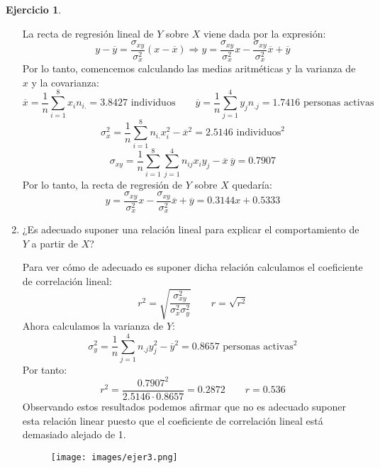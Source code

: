 \documentclass[a4paper, 12pt]{article}
\theoremstyle{definition}
\newtheorem{ej}{Ejercicio}
\begin{document}
\begin{ej}
\begin{enumerate}[label=\alph*)]
La recta de regresión lineal de \(Y\) sobre \(X\) viene dada por la expresión:
\[
	y - \overline{y}  =\frac{\sigma_{xy}}{\sigma_x^2} (x - \overline{x}) \Rightarrow y = \frac{\sigma_{xy}}{\sigma_x^2}x - \frac{\sigma_{xy}}{\sigma_x^2} \overline{x} + \overline{y}
\]
Por lo tanto, comencemos calculando las medias aritméticas y la varianza de \(x\) y la covarianza:
\[
	\overline{x} = \frac{1}{n} \sum_{i=1}^{8} x_i n_{i.} = 3.8427 \text{ individuos} \qquad \overline{y} = \frac{1}{n} \sum_{j=1}^{4} y_j n_{.j} = 1.7416 \text{ personas activas}
\]
\[
	\sigma_x^2 = \frac{1}{n} \sum_{i=1}^{8} n_{i.} x_i^2 - \overline{x}^2 = 2.5146 \text{ individuos}^2
\]
\[
	\sigma_{xy} = \frac{1}{n} \sum_{i=1}^{8} \sum_{j=1}^{4} n_{ij} x_i y_j - \overline{x}\ \overline{y} = 0.7907
\]
Por lo tanto, la recta de regresión de \(Y\) sobre \(X\) quedaría:
\[
	y = \frac{\sigma_{xy}}{\sigma_x^2}x - \frac{\sigma_{xy}}{\sigma_x^2} \overline{x} + \overline{y} = 0.3144x + 0.5333
\]

	\item ¿Es adecuado suponer una relación lineal para explicar el comportamiento de \(Y\) a partir de \(X\)?
	
Para ver cómo de adecuado es suponer dicha relación calculamos el coeficiente de correlación lineal:
\[
	r^2 = \sqrt{\frac{\sigma_{xy}^2}{\sigma_x^2 \sigma_y^2}} \qquad r = \sqrt{r^2}
\]
Ahora calculamos la varianza de \(Y\):
\[
	\sigma_y^2 = \frac{1}{n} \sum_{j=1}^{4} n_{.j} y_j^2 - \overline{y}^2 = 0.8657 \text{ personas activas}^2
\]
Por tanto:
\[
	r^2 = \frac{0.7907^2}{2.5146 \cdot 0.8657} = 0.2872 \qquad r = 0.536
\]
Observando estos resultados podemos afirmar que no es adecuado suponer esta relación linear puesto que el coeficiente de correlación lineal está demasiado alejado de 1.

\begin{figure}[h!]
	\centering
	\texttt{[image: images/ejer3.png]}
\end{figure}

\end{enumerate}

\end{ej}


\newpage
\end{document}
